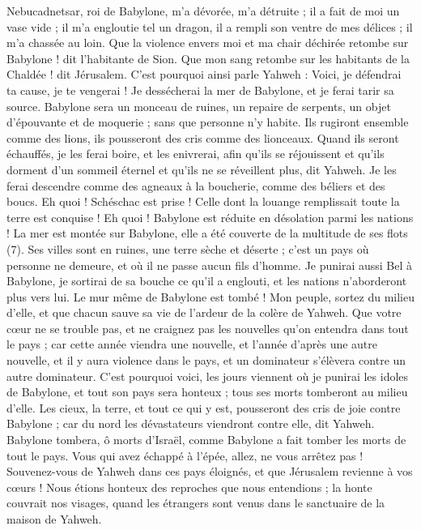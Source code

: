 \begin{multicols}{2}
Nebucadnetsar, roi de Babylone, m'a dévorée, m'a détruite ; il a fait de moi un vase vide ; il m'a engloutie tel un dragon, il a rempli son ventre de mes délices ; il m'a chassée au loin.
Que la violence envers moi et ma chair déchirée retombe sur Babylone ! dit l'habitante de Sion. Que mon sang retombe sur les habitants de la Chaldée ! dit Jérusalem.
C'est pourquoi ainsi parle Yahweh : Voici, je défendrai ta cause, je te vengerai ! Je dessécherai la mer de Babylone, et je ferai tarir sa source.
Babylone sera un monceau de ruines, un repaire de serpents, un objet d’épouvante et de moquerie ; sans que personne n'y habite.
Ils rugiront ensemble comme des lions, ils pousseront des cris comme des lionceaux.
Quand ils seront échauffés, je les ferai boire, et les enivrerai, afin qu'ils se réjouissent et qu'ils dorment d'un sommeil éternel et qu'ils ne se réveillent plus, dit Yahweh.
Je les ferai descendre comme des agneaux à la boucherie, comme des béliers et des boucs.
Eh quoi ! Schéschac est prise ! Celle dont la louange remplissait toute la terre est conquise ! Eh quoi ! Babylone est réduite en désolation parmi les nations !
La mer est montée sur Babylone, elle a été couverte de la multitude de ses flots\FTNT{} (7).
Ses villes sont en ruines, une terre sèche et déserte ; c'est un pays où personne ne demeure, et où il ne passe aucun fils d'homme.
Je punirai aussi Bel à Babylone, je sortirai de sa bouche ce qu'il a englouti, et les nations n'aborderont plus vers lui. Le mur même de Babylone est tombé !
Mon peuple, sortez du milieu d'elle, et que chacun sauve sa vie de l'ardeur de la colère de Yahweh.
Que votre cœur ne se trouble pas, et ne craignez pas les nouvelles qu'on entendra dans tout le pays ; car cette année viendra une nouvelle, et l'année d'après une autre nouvelle, et il y aura violence dans le pays, et un dominateur s'élèvera contre un autre dominateur.
C'est pourquoi voici, les jours viennent où je punirai les idoles de Babylone, et tout son pays sera honteux ; tous ses morts tomberont au milieu d'elle.
Les cieux, la terre, et tout ce qui y est, pousseront des cris de joie contre Babylone ; car du nord les dévastateurs viendront contre elle, dit Yahweh.
Babylone tombera, ô morts d'Israël, comme Babylone a fait tomber les morts de tout le pays.
Vous qui avez échappé à l'épée, allez, ne vous arrêtez pas ! Souvenez-vous de Yahweh dans ces pays éloignés, et que Jérusalem revienne à vos cœurs !
Nous étions honteux des reproches que nous entendions ; la honte couvrait nos visages, quand les étrangers sont venus dans le sanctuaire de la maison de Yahweh.

\end{multicols}
